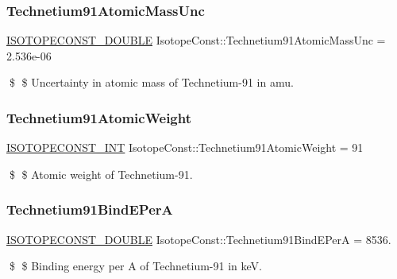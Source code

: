 \subsubsection{\texorpdfstring{Technetium91\+Atomic\+Mass\+Unc}{Technetium91AtomicMassUnc}}
{\footnotesize\ttfamily \mbox{\hyperlink{group___isotope_const-_macros_ga8f45a7272ce02c0b4c65c44636ed719a}{I\+S\+O\+T\+O\+P\+E\+C\+O\+N\+S\+T\+\_\+\+D\+O\+U\+B\+LE}} Isotope\+Const\+::\+Technetium91\+Atomic\+Mass\+Unc = 2.\+536e-\/06}

\$ \$ Uncertainty in atomic mass of Technetium-\/91 in amu. \mbox{\label{group___isotope_const-_technetium-_tc91_ga9f1b4359463419b0095fe46c0fd9ed14}} 
\subsubsection{\texorpdfstring{Technetium91\+Atomic\+Weight}{Technetium91AtomicWeight}}
{\footnotesize\ttfamily \mbox{\hyperlink{group___isotope_const-_macros_ga5f18360b3e99483a35c32d789e62621c}{I\+S\+O\+T\+O\+P\+E\+C\+O\+N\+S\+T\+\_\+\+I\+NT}} Isotope\+Const\+::\+Technetium91\+Atomic\+Weight = 91}

\$ \$ Atomic weight of Technetium-\/91. \mbox{\label{group___isotope_const-_technetium-_tc91_ga0eaf9f5945a27fcabece7db43d3c0a16}} 
\subsubsection{\texorpdfstring{Technetium91\+Bind\+E\+PerA}{Technetium91BindEPerA}}
{\footnotesize\ttfamily \mbox{\hyperlink{group___isotope_const-_macros_ga8f45a7272ce02c0b4c65c44636ed719a}{I\+S\+O\+T\+O\+P\+E\+C\+O\+N\+S\+T\+\_\+\+D\+O\+U\+B\+LE}} Isotope\+Const\+::\+Technetium91\+Bind\+E\+PerA = 8536.}

\$ \$ Binding energy per A of Technetium-\/91 in keV. \mbox{\label{group___isotope_const-_technetium-_tc91_ga9e816d0504d8a74e7370484b130ddf3e}} 
